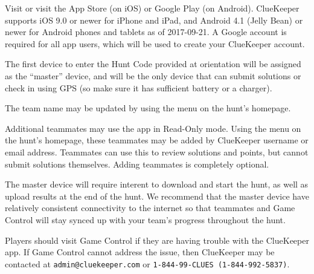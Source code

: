 

Visit  or visit the App Store (on iOS) or Google Play
(on Android). ClueKeeper supports iOS 9.0 or newer for iPhone and
iPad, and Android 4.1 (Jelly Bean) or newer for Android phones and tablets
as of 2017-09-21.
A Google account is required for all app users, which will be used to
create your ClueKeeper account.


The first device to enter the Hunt Code provided at orientation
will be assigned as the
``master'' device, and will be the only device that can submit solutions
or check in using GPS (so make sure it has sufficient battery or a charger).

The team name may be updated by using the menu on the hunt's homepage.

Additional teammates may use the app in Read-Only mode. Using the menu on
the hunt's homepage, these teammates may be added by ClueKeeper username
or email address. Teammates can use this to review solutions and points,
but cannot submit solutions themselves. Adding teammates is completely optional.


The master device will require interent to download and start the hunt,
as well as upload results at the end of the hunt. We recommend that
the master device have relatively consistent connectivity to the internet
so that teammates and Game Control will stay synced up with your team's
progress throughout the hunt.


Players should visit Game Control if they are having trouble with
the ClueKeeper app. If Game Control cannot address the issue, then
ClueKeeper may be contacted at \texttt{admin@cluekeeper.com} or
\texttt{1-844-99-CLUES (1-844-992-5837)}.


